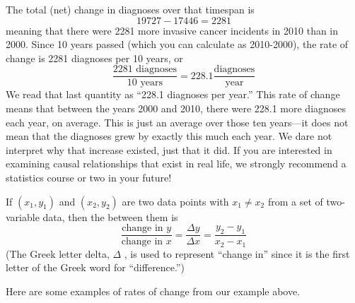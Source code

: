 \documentclass[nooutcomes]{ximera}
\begin{document}
\begin{example}
\begin{explanation}
The total (net) change in diagnoses over that timespan is
$$19727-17446=2281$$
meaning that there were 2281 more invasive cancer incidents in 2010 than in 2000. Since 10 years passed (which you can calculate as 2010-2000), the rate of change is 2281 diagnoses per 10 years, or
$$\frac{2281 \text{ diagnoses}}{10 \text{ years}} = 228.1 \frac{\text{diagnoses}}{\text{year}}$$
We read that last quantity as ``228.1 diagnoses per year.'' This rate of change means that between the years 2000 and 2010, there were 228.1 more diagnoses each year, on average. This is just an average over those ten years—it does not mean that the diagnoses grew by exactly this much each year.  We dare not interpret why that increase existed,  just that it did.  If you are interested in examining causal relationships that exist in real life,  we strongly recommend a statistics course or two in your future!
\end{explanation}
\end{example}


\begin{definition} 
 If $(x_1,y_1)$ and $(x_2,y_2)$ are two data points with $x_1 \neq x_2$ from a set of two-variable data, then the  between them is
$$ \frac{\text{change in } y}{\text{change in } x} = \frac{\Delta y}{\Delta x} = \frac{y_2-y_1}{x_2-x_1}$$
(The Greek letter delta, $\Delta$ , is used to represent ``change in'' since it is the first letter of the Greek word for ``difference.'')
\end{definition}


Here are some examples of rates of change from our example above.
\end{document}
